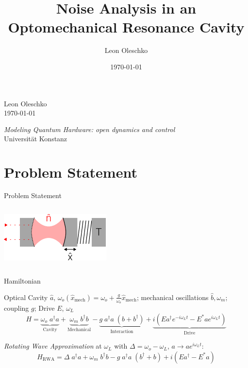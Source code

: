 \documentclass{beamer}
\title{Noise Analysis in an Optomechanical Resonance Cavity}
\author{Leon Oleschko}
\institute{Universität Konstanz}
\date{\today}
\begin{document}
{
\begin{frame}
	\huge
	
	\vfill
	\normalsize
	Leon Oleschko\\
	\today
	
	\vfill
	\raggedleft
	\small
	\textit{Modeling Quantum Hardware: open dynamics and control}\\
	Universität Konstanz
\end{frame}
}

\section{Problem Statement}
\begin{frame}{Problem Statement}
	\begin{columns}
		\includegraphics[width=\textwidth]{figures/drawing.pdf}

	\end{columns}

\end{frame}

\begin{frame}{Hamiltonian}

	{
		\small
		Optical Cavity $\hat a$, $\omega_o(\hat x_\text{mech}) = \omega_o + \frac{g}{\omega_o} \hat x_\text{mech}$;
		mechanical oscillations $\hat b, \omega_m$;
		coupling $g$;
		Drive $E$, $\omega_L$
	}
	$$
		H = \underbrace{
			\omega_o\; a^\dagger a
		}_\text{Cavity} 
		+ \underbrace{
			\omega_m\; b^\dagger b
		}_\text{Mechanical}
		- \underbrace{
			g\; a^\dagger a\; (b + b^\dagger)
		}_{\text{Interaction}}
		+ \underbrace{
			i ( E a^\dagger e^{-i\omega_L t} - E^* a e^{i\omega_L t})
		}_{\text{Drive}}
	$$

	\pause
	\emph{Rotating Wave Approximation} at $\omega_L$ with $\Delta = \omega_o - \omega_L$, $a \rightarrow ae^{i\omega_L t}$:
	$$
		H_\text{RWA} = \Delta\; a^\dagger a + \omega_m\; b^\dagger b - g\; a^\dagger a\; (b^\dagger + b) + i (E a^\dagger - E^* a)
	$$

\end{frame}
\end{document}
